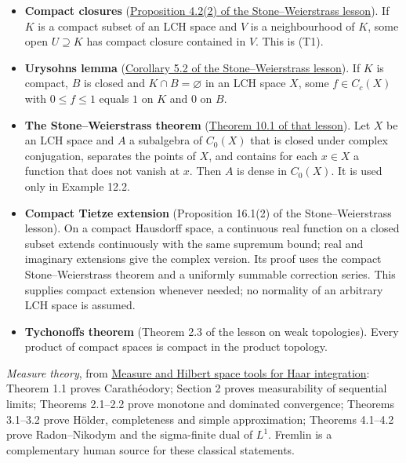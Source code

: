 \documentclass[
  english,
  11pt,
  a4paper,
]{article}
\providecommand{\tightlist}{%
  \setlength{\itemsep}{0pt}\setlength{\parskip}{0pt}}
\begin{document}
\begin{itemize}
\tightlist
\item
  \textbf{Compact closures}
  (\hyperlink{the-stone-weierstrass-theorem-for-functions-vanishing-at-infinity--oa-fnd-sw-15}{Proposition
  4.2(2) of the Stone--Weierstrass lesson}). If \(K\) is a compact
  subset of an LCH space and \(V\) is a neighbourhood of \(K\), some
  open \(U\supseteq K\) has compact closure contained in \(V\). This is
  (T1).
\item
  \textbf{Urysohn\textquotesingle s lemma}
  (\hyperlink{the-stone-weierstrass-theorem-for-functions-vanishing-at-infinity--oa-fnd-sw-16}{Corollary
  5.2 of the Stone--Weierstrass lesson}). If \(K\) is compact, \(B\) is
  closed and \(K\cap B=\varnothing\) in an LCH space \(X\), some
  \(f\in C_c(X)\) with \(0\leq f\leq1\) equals \(1\) on \(K\) and \(0\)
  on \(B\).
\item
  \textbf{The Stone--Weierstrass theorem}
  (\hyperlink{the-stone-weierstrass-theorem-for-functions-vanishing-at-infinity--oa-fnd-sw-09}{Theorem
  10.1 of that lesson}). Let \(X\) be an LCH space and \(A\) a
  subalgebra of \(C_0(X)\) that is closed under complex conjugation,
  separates the points of \(X\), and contains for each \(x\in X\) a
  function that does not vanish at \(x\). Then \(A\) is dense in
  \(C_0(X)\). It is used only in Example 12.2.
\item
  \textbf{Compact Tietze extension} (Proposition 16.1(2) of the
  Stone--Weierstrass lesson). On a compact Hausdorff space, a continuous
  real function on a closed subset extends continuously with the same
  supremum bound; real and imaginary extensions give the complex
  version. Its proof uses the compact Stone--Weierstrass theorem and a
  uniformly summable correction series. This supplies compact extension
  whenever needed; no normality of an arbitrary LCH space is assumed.
\item
  \textbf{Tychonoff\textquotesingle s theorem} (Theorem 2.3 of the
  lesson on weak topologies). Every product of compact spaces is compact
  in the product topology.
\end{itemize}

\emph{Measure theory}, from
\hyperref[measure-and-hilbert-space-tools]{Measure and Hilbert space
tools for Haar integration}: Theorem 1.1 proves Carathéodory; Section 2
proves measurability of sequential limits; Theorems 2.1--2.2 prove
monotone and dominated convergence; Theorems 3.1--3.2 prove Hölder,
completeness and simple approximation; Theorems 4.1--4.2 prove
Radon--Nikodym and the sigma-finite dual of \(L^1\). Fremlin is a
complementary human source for these classical statements.
\end{document}
